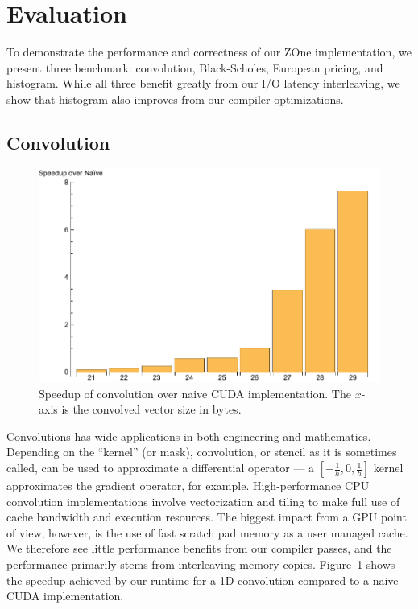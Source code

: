 \section{Evaluation}

To demonstrate the performance and correctness of our ZOne implementation, we
present three benchmark: convolution, Black-Scholes, European pricing, and histogram.
While all three benefit greatly from our I/O latency interleaving, we show
	that histogram also improves from our compiler optimizations.


\subsection{Convolution}

\begin{figure}
\centering
\includegraphics[scale=0.5]{data/stencil.pdf}
\caption{Speedup of convolution over naive CUDA implementation.
	The $x$-axis is the convolved vector size in bytes.}
\label{fig:stencil}
\centering
\end{figure}

Convolutions has wide applications in both engineering and mathematics.
Depending on the ``kernel'' (or mask), convolution, or stencil as it is sometimes called,  	can be used to approximate a differential operator --- 
 a $[-\frac{1}{h}, 0, \frac{1}{h}]$ kernel approximates the gradient operator, for example.
High-performance CPU convolution implementations
involve vectorization and tiling to make full use of cache bandwidth and 
execution resources.
The biggest impact from a GPU point of view, however, is the use of fast 
	scratch pad memory as a user managed cache.
We therefore see little performance benefits from our compiler passes, and the
	performance primarily stems from interleaving memory copies.
Figure~\ref{fig:stencil} shows the speedup achieved by our runtime for a 1D
	convolution compared to a naive CUDA implementation.


